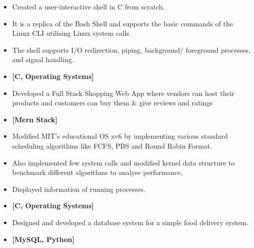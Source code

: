 \documentclass[10pt,a4paper,ragged2e,withhyper]{altacv}
\begin{document}
\begin{paracol}{2}
\textbf{}
\begin{itemize}
    \item Created a user-interactive shell in C from scratch.
    \item It is a replica of the Bash Shell and supports the basic commands of the Linux CLI utilising Linux system calls.
    \item The shell supports I/O redirection, piping, background/ foreground processes, and signal handling.
    \item \textbf{[C, Operating Systems]}
\end{itemize}
\divider


\textbf{}
\begin{itemize}
    \item  Developed a Full Stack Shopping Web App where vendors can host their products and customers can buy them & give reviews and ratings
    \item \textbf{[Mern Stack]}
\end{itemize}

\divider


\textbf{}
\begin{itemize}
    \item Modified MIT’s educational OS xv6 by implementing various standard scheduling algorithms like FCFS, PBS and Round Robin Format. 
    \item Also implemented few system calls and modified kernel data structure to benchmark different algorithms to analyse performance.
    \item Displayed information of running processes.
     \item \textbf{[C, Operating Systems]}
\end{itemize}
 \divider
 


\textbf{}
\begin{itemize}
    \item Designed and developed a database system for a simple food delivery system.
    \item \textbf{[MySQL, Python]}
\end{itemize}


\end{paracol}
\end{document}
